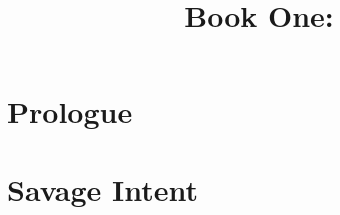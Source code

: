 \documentclass[a4paper,12pt,oneside]{book}
\title{%
  \SentinelsofMith
  \\
  Book One:
  \\
  \TwilightAngelRememberEmph
}
\begin{document}
  \stuffatthebeginning
  
  
  
  \begin{comment}
  \part{Front matter}
  \end{comment}
  
  
  
  \newpage
  
  \newpage
  
  
  
  \newpage
  
  
  
  
  
  
  \part{Prologue}
    
    
    
  
  \part{Savage Intent}
    
    
    
    
    
    
    
    
    
    
    
  
\end{document}
